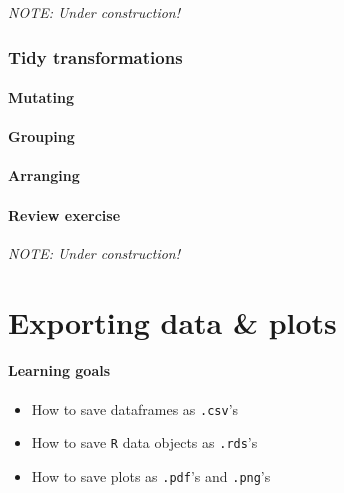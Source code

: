 \documentclass[
]{book}
\providecommand{\tightlist}{%
  \setlength{\itemsep}{0pt}\setlength{\parskip}{0pt}}
\begin{document}
\emph{NOTE: Under construction!}

\hypertarget{tidy-transformations}{%
\subsection*{Tidy transformations}\label{tidy-transformations}}

\hypertarget{mutating}{%
\subsubsection*{Mutating}\label{mutating}}

\hypertarget{grouping}{%
\subsubsection*{Grouping}\label{grouping}}

\hypertarget{arranging}{%
\subsubsection*{Arranging}\label{arranging}}

\hypertarget{review-exercise-1}{%
\subsubsection*{Review exercise}\label{review-exercise-1}}

\emph{NOTE: Under construction!}

\hypertarget{exporting-data-plots}{%
\chapter{Exporting data \& plots}\label{exporting-data-plots}}

\hypertarget{learning-goals-10}{%
\subsubsection*{Learning goals}\label{learning-goals-10}}

\begin{itemize}
\tightlist
\item
  How to save dataframes as \texttt{.csv}'s
\item
  How to save \texttt{R} data objects as \texttt{.rds}'s
\item
  How to save plots as \texttt{.pdf}'s and \texttt{.png}'s
\end{itemize}
\end{document}
